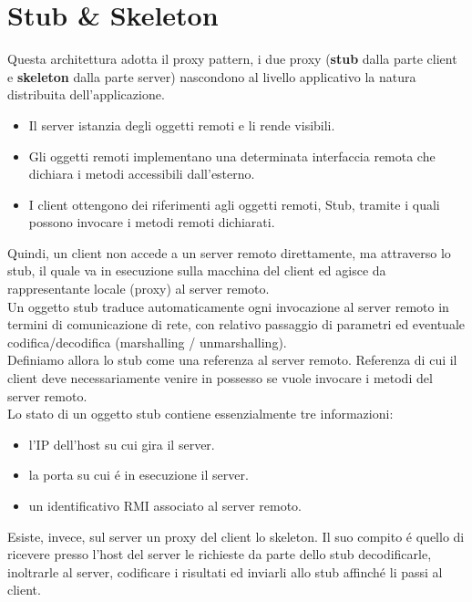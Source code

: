 \documentclass[a4paper, 12 pt, italian]{report}
\begin{document}
\section{Stub \& Skeleton}
Questa architettura adotta il proxy pattern, i due proxy (\textbf{stub} dalla parte client e \textbf{skeleton} dalla parte server) nascondono al livello applicativo la natura distribuita dell'applicazione.\\

\begin{itemize}

\item Il server istanzia degli oggetti remoti e li rende visibili.

\item Gli oggetti remoti implementano una determinata interfaccia remota che dichiara i metodi accessibili dall'esterno.

\item I client ottengono dei riferimenti agli oggetti remoti, Stub, tramite i quali possono invocare i metodi remoti dichiarati.

\end{itemize}
Quindi, un client non accede a un server remoto direttamente, ma attraverso lo stub, il quale va in esecuzione sulla macchina del client ed agisce da rappresentante locale (proxy) al server remoto.\\
Un oggetto stub traduce automaticamente ogni invocazione al server remoto in termini di comunicazione di rete, con relativo passaggio di parametri ed eventuale codifica/decodifica (marshalling / unmarshalling).\\
Definiamo allora lo stub come una referenza al server remoto. Referenza di cui il client deve necessariamente venire in possesso se vuole invocare i metodi del server remoto.\\
Lo stato di un oggetto stub contiene essenzialmente tre informazioni: 
\begin{itemize}

\item l'IP dell'host su cui gira il server.
\item la porta su cui \'e in esecuzione il server.
\item un identificativo RMI associato al server remoto.
\end{itemize}
Esiste, invece, sul server un proxy del client lo skeleton. Il suo compito \'e quello di ricevere presso l'host del server le richieste da parte dello stub decodificarle, inoltrarle al server, codificare i risultati ed inviarli allo stub affinch\'e li passi al client.
\newpage
\end{document}
